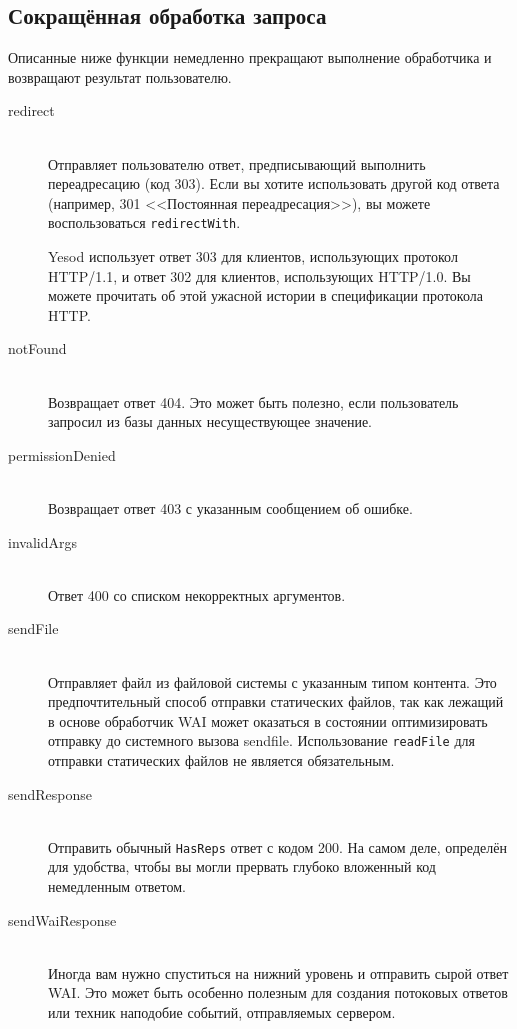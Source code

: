\subsection{Сокращённая обработка запроса}
Описанные ниже функции немедленно прекращают выполнение обработчика и
возвращают результат пользователю.
\begin{description}
\item[redirect] \hfill \\
  Отправляет пользователю ответ, предписывающий выполнить переадресацию (код 303). Если вы
  хотите использовать другой код ответа (например, 301 <<Постоянная переадресация>>), вы
  можете воспользоваться \lstinline!redirectWith!.

\begin{remark}
Yesod использует ответ 303 для клиентов, использующих протокол HTTP/1.1, и ответ
302 для клиентов, использующих HTTP/1.0. Вы можете прочитать об этой
ужасной истории в спецификации протокола HTTP.
\end{remark}

\item[notFound] \hfill \\
Возвращает ответ 404. Это может быть полезно, если пользователь
запросил из базы данных несуществующее значение.

\item[permissionDenied] \hfill \\
Возвращает ответ 403 с указанным сообщением об ошибке.

\item[invalidArgs] \hfill \\
Ответ 400 со списком некорректных аргументов.

\item[sendFile] \hfill \\
Отправляет файл из файловой системы с указанным типом контента. Это
предпочтительный способ отправки статических файлов, так как лежащий
в основе обработчик WAI может оказаться в состоянии оптимизировать
отправку до системного вызова sendfile. Использование
\lstinline!readFile! для отправки статических файлов не является
обязательным.

\item[sendResponse] \hfill \\
Отправить обычный \lstinline!HasReps! ответ с кодом 200. На самом
деле, определён для удобства, чтобы вы могли прервать глубоко
вложенный код немедленным ответом.

\item[sendWaiResponse] \hfill \\
Иногда вам нужно спуститься на нижний уровень и отправить сырой ответ
WAI. Это может быть особенно полезным для создания потоковых ответов
или техник наподобие событий, отправляемых сервером.
\end{description}

